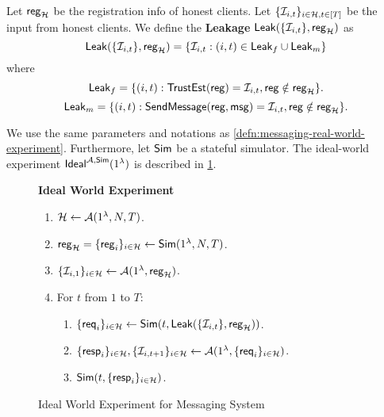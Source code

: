 \begin{definition}
\label{defn:messaging-leakage}
Let $\mathsf{reg}_{\mathcal{H}}$ be the registration info of honest clients. Let $\{\mathcal{I}_{i, t}\}_{i \in \mathcal{H}, t \in [T]}$ be the input from honest clients. We define the \textbf{Leakage} $\mathsf{Leak}(\{\mathcal{I}_{i, t}\}, \mathsf{reg}_{\mathcal{H}})$ as
$$\mathsf{Leak}(\{\mathcal{I}_{i, t}\}, \mathsf{reg}_{\mathcal{H}}) = \{\mathcal{I}_{i, t}: (i, t) \in \mathsf{Leak}_f \cup \mathsf{Leak}_m\}$$
where
$$\mathsf{Leak}_f = \{(i, t): \mathsf{TrustEst}(\mathsf{reg}) = \mathcal{I}_{i, t}, \mathsf{reg} \notin \mathsf{reg}_{\mathcal{H}}\}.$$
$$\mathsf{Leak}_m = \{(i, t): \mathsf{SendMessage}(\mathsf{reg}, \mathsf{msg}) = \mathcal{I}_{i, t}, \mathsf{reg} \notin \mathsf{reg}_{\mathcal{H}}\}.$$
\end{definition}
\begin{definition}
\label{defn:messaging-ideal-world-experiment}
We use the same parameters and notations as \cref{defn:messaging-real-world-experiment}. Furthermore, let $\mathsf{Sim}$ be a stateful simulator. The ideal-world experiment $\mathsf{Ideal}^{\mathcal{A}, \mathsf{Sim}}(1^{\lambda})$ is described in \cref{expr:messaging-ideal-world}.
\begin{figure}[h]
\begin{framed}
\textbf{Ideal World Experiment}
\begin{enumerate}
\item $\mathcal{H} \leftarrow \mathcal{A}(1^{\lambda}, N, T)$.
\item $\mathsf{reg}_{\mathcal{H}} = \{\mathsf{reg}_i\}_{i \in \mathcal{H}} \leftarrow \mathsf{Sim}(1^{\lambda}, N, T)$. 
\item $\{\mathcal{I}_{i, 1}\}_{i \in \mathcal{H}} \leftarrow \mathcal{A}(1^{\lambda}, \mathsf{reg}_{\mathcal{H}})$.
\item For $t$ from $1$ to $T$:
    \begin{enumerate}
    \item  $\{\mathsf{req}_i\}_{i \in \mathcal{H}} \leftarrow \mathsf{Sim}(t, \mathsf{Leak}(\{\mathcal{I}_{i, t}\}, \mathsf{reg}_{\mathcal{H}}))$.
    
    \item $\{\mathsf{resp}_i\}_{i \in \mathcal{H}}, \{\mathcal{I}_{i, t + 1}\}_{i \in \mathcal{H}} \leftarrow \mathcal{A}(1^{\lambda}, \{\mathsf{req}_i\}_{i \in \mathcal{H}})$.
    
    \item $\mathsf{Sim}(t, \{\mathsf{resp}_i\}_{i \in \mathcal{H}})$.
    \end{enumerate}
\end{enumerate}
\end{framed}
\caption{Ideal World Experiment for Messaging System}
\label{expr:messaging-ideal-world}
\end{figure}

\end{definition}

